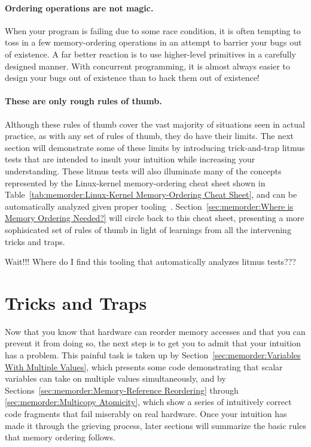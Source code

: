 \paragraph{Ordering operations are not magic.}
When your program is failing due to some race condition, it is often
tempting to toss in a few memory-ordering operations in an attempt
to barrier your bugs out of existence.
A far better reaction is to use higher-level primitives in a carefully
designed manner.
With concurrent programming, it is almost always easier to design
your bugs out of existence than to hack them out of existence!

\paragraph{These are only rough rules of thumb.}
Although these rules of thumb cover the vast majority of situations
seen in actual practice, as with any set of rules of thumb, they
do have their limits.
The next section will demonstrate some of these limits by introducing
trick-and-trap litmus tests that are intended to insult your
intuition while increasing your understanding.
These litmus tests will also illuminate many of the concepts
represented by the Linux-kernel memory-ordering cheat sheet shown in
Table~\ref{tab:memorder:Linux-Kernel Memory-Ordering Cheat Sheet},
and can be automatically analyzed given proper
tooling~\cite{Alglave:2018:FSC:3173162.3177156}.
Section~\ref{sec:memorder:Where is Memory Ordering Needed?} will
circle back to this cheat sheet, presenting a more sophisicated set of
rules of thumb in light of learnings from all the intervening tricks
and traps.

\QuickQuiz{}
	Wait!!!
	Where do I find this tooling that automatically analyzes
	litmus tests???
 \QuickQuizEnd

\section{Tricks and Traps}
\label{sec:memorder:Tricks and Traps}

Now that you know that hardware can reorder memory accesses and that you
can prevent it from doing so, the next step is to get you to admit
that your intuition has a problem.
This painful task is taken up by
Section~\ref{sec:memorder:Variables With Multiple Values},
which presents some code demonstrating that scalar variables can
take on multiple values simultaneously,
and by
Sections~\ref{sec:memorder:Memory-Reference Reordering} through
\ref{sec:memorder:Multicopy Atomicity},
which show a series of intuitively correct code fragments that fail miserably
on real hardware.
Once your intuition has made it through the grieving process, later
sections will summarize the basic rules that memory ordering follows.

